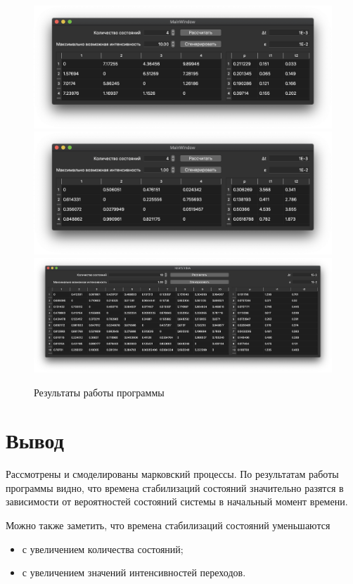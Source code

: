 \documentclass[a4paper,oneside,12pt]{extreport}
\begin{document}
\begin{figure}[H]
	\centering
	\includegraphics[width=\linewidth]{inc/img/result-4-10.png}
	\includegraphics[width=\linewidth]{inc/img/result-4-1.png}
	\includegraphics[width=0.95\linewidth]{inc/img/result-10-1.png}
	\caption{Результаты работы программы}
	\label{img:result}
\end{figure}

\chapter*{Вывод}

Рассмотрены и смоделированы марковский процессы.
По результатам работы программы видно, что времена стабилизаций состояний значительно разятся в зависимости от вероятностей состояний системы в начальный момент времени.

Можно также заметить, что времена стабилизаций состояний уменьшаются
\begin{itemize}
	\item с увеличением количества состояний;
	\item с увеличением значений интенсивностей переходов.
\end{itemize}
\end{document}
